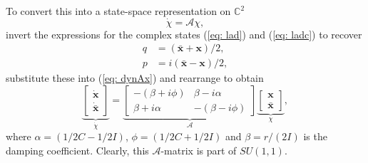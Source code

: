 \documentclass{article}
\begin{document}
To convert this into a state-space representation on $\mathbb{C}^{2}$
\begin{equation}
    \dot{\chi} = \mathcal{A} \chi ,
\end{equation}
invert the expressions for the complex states (\ref{eq: lad}) and (\ref{eq: ladc}) to recover
 \begin{align}
\label{eq: q}
    q &= (\bar{\textbf{x}}+\textbf{x})/2,\\
\label{eq: p}    
    p &= i(\bar{\textbf{x}}-\textbf{x})/2,
\end{align}
 substitute these into (\ref{eq: dynAx}) and rearrange to obtain
\begin{equation}
\label{eq: achi}
    \underbrace{\begin{bmatrix}
    \dot{\textbf{x}}\\\dot{\bar{\textbf{x}}}
    \end{bmatrix}}_{\dot{\chi}}=\underbrace{ \begin{bmatrix}
    -(\beta+i\phi) &\beta-i\alpha\\
    \beta+i\alpha  &-(\beta-i\phi) 
    \end{bmatrix}}_{\mathcal{A}}
    \underbrace{\begin{bmatrix}
    \textbf{x}\\\bar{\textbf{x}}
    \end{bmatrix}}_{\chi},
\end{equation}
where $\alpha=  (1/2C-1/2I)$, $\phi= (1/2C+1/2I)$ and $\beta=r/(2I)$ is the damping coefficient. %
Clearly, this $\mathcal{A}$-matrix is part of $SU(1,1)$.
\end{document}
